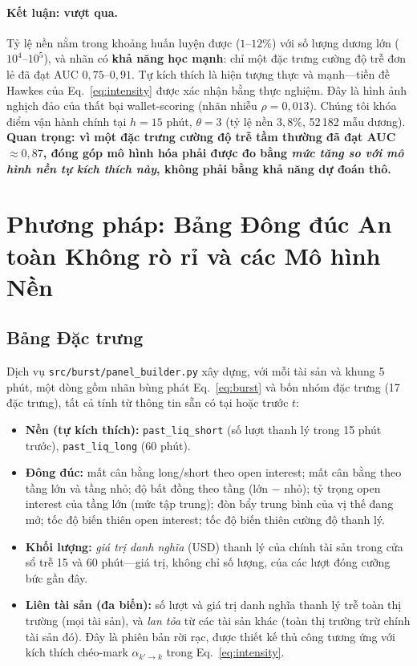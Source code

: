 \documentclass[11pt,a4paper]{article}
\begin{document}
\paragraph{Kết luận: vượt qua.} Tỷ lệ nền nằm trong khoảng huấn luyện được ($1$--$12\%$) với số lượng dương lớn ($10^4$--$10^5$), và nhãn có \textbf{khả năng học mạnh}: chỉ một đặc trưng cường độ trễ đơn lẻ đã đạt AUC $0{,}75$--$0{,}91$. Tự kích thích là hiện tượng thực và mạnh---tiền đề Hawkes của Eq.~\eqref{eq:intensity} được xác nhận bằng thực nghiệm. Đây là hình ảnh nghịch đảo của thất bại wallet-scoring (nhãn nhiễu $\rho=0{,}013$). Chúng tôi khóa điểm vận hành chính tại $h=15$ phút, $\theta=3$ (tỷ lệ nền $3{,}8\%$, 52\,182 mẫu dương). \textbf{Quan trọng: vì một đặc trưng cường độ trễ tầm thường đã đạt AUC $\approx 0{,}87$, đóng góp mô hình hóa phải được đo bằng \emph{mức tăng so với mô hình nền tự kích thích này}, không phải bằng khả năng dự đoán thô.}

\section{Phương pháp: Bảng Đông đúc An toàn Không rò rỉ và các Mô hình Nền}

\subsection{Bảng Đặc trưng}

Dịch vụ \texttt{src/burst/panel\_builder.py} xây dựng, với mỗi tài sản và khung 5 phút, một dòng gồm nhãn bùng phát Eq.~\eqref{eq:burst} và bốn nhóm đặc trưng (17 đặc trưng), tất cả tính từ thông tin sẵn có tại hoặc trước $t$:

\begin{itemize}[nosep]
    \item \textbf{Nền (tự kích thích):} \texttt{past\_liq\_short} (số lượt thanh lý trong 15 phút trước), \texttt{past\_liq\_long} (60 phút).
    \item \textbf{Đông đúc:} mất cân bằng long/short theo open interest; mất cân bằng theo tầng lớn và tầng nhỏ; độ bất đồng theo tầng (lớn $-$ nhỏ); tỷ trọng open interest của tầng lớn (mức tập trung); đòn bẩy trung bình của vị thế đang mở; tốc độ biến thiên open interest; tốc độ biến thiên cường độ thanh lý.
    \item \textbf{Khối lượng:} \emph{giá trị danh nghĩa} (USD) thanh lý của chính tài sản trong cửa sổ trễ 15 và 60 phút---giá trị, không chỉ số lượng, của các lượt đóng cưỡng bức gần đây.
    \item \textbf{Liên tài sản (đa biến):} số lượt và giá trị danh nghĩa thanh lý trễ toàn thị trường (mọi tài sản), và \emph{lan tỏa} từ các tài sản khác (toàn thị trường trừ chính tài sản đó). Đây là phiên bản rời rạc, được thiết kế thủ công tương ứng với kích thích chéo-mark $\alpha_{k'\to k}$ trong Eq.~\eqref{eq:intensity}.
\end{itemize}
\end{document}
